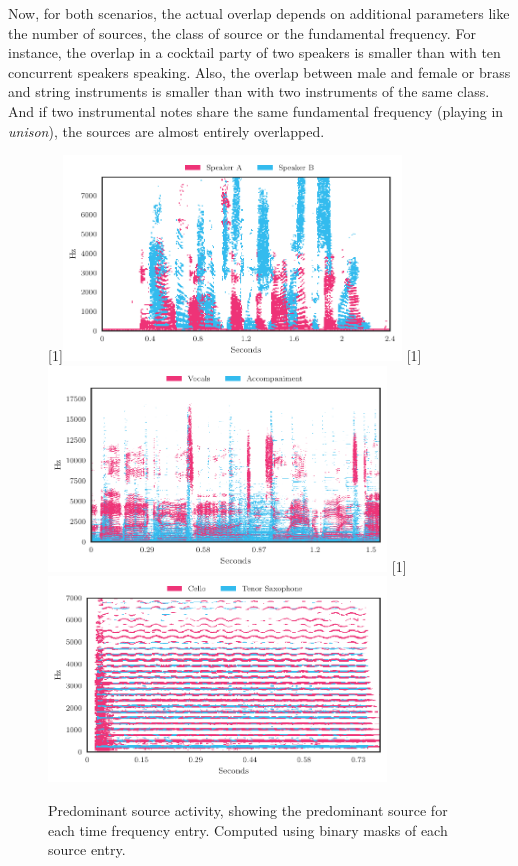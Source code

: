 Now, for both scenarios, the actual overlap depends on additional parameters like the number of sources, the class of source or the fundamental frequency.
For instance, the overlap in a cocktail party of two speakers is smaller than with ten concurrent speakers speaking.
Also, the overlap between male and female or brass and string instruments is smaller than with two instruments of the same class. 
And if two instrumental notes share the same fundamental frequency (playing in \emph{unison}), the sources are almost entirely overlapped.
\par
\begin{figure}[h]
\centering
{}%
[1\textwidth]{\includegraphics[width=0.8\textwidth]{gfx/dominance_map_speakers.pdf}}%
\hspace{0.2\textwidth} %
[1\textwidth]{\includegraphics[width=0.8\textwidth]{gfx/dominance_map_vocacc.pdf}}%
\hspace{0.2\textwidth} %
[1\textwidth]{\includegraphics[width=0.8\textwidth]{gfx/dominance_map_unison.pdf}}%
\caption{Predominant source activity, showing the predominant source for each time frequency entry. Computed using binary masks of each source entry.}
\label{fig:dominance}
\end{figure}

